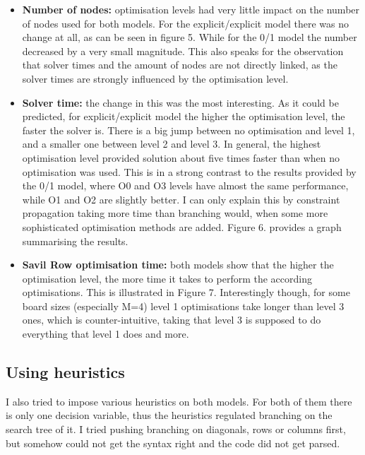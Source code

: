 \documentclass{report}
\newcommand{\tab}{\hspace*{1.5em}}
\begin{document}
\begin{itemize}
\item \textbf{Number of nodes:} optimisation levels had very little impact on the number of nodes used for both models. For the explicit/explicit model there was no change at all, as can be seen in figure 5. While for the 0/1 model the number decreased by a very small magnitude. This also speaks for the observation that solver times and the amount of nodes are not directly linked, as the solver times are strongly influenced by the optimisation level.
\item \textbf{Solver time:} the change in this was the most interesting. As it could be predicted, for explicit/explicit model the higher the optimisation level, the faster the solver is. There is a big jump between no optimisation and level 1, and a smaller one between level 2 and level 3. In general, the highest optimisation level provided solution about five times faster than when no optimisation was used. This is in a strong contrast to the results provided by the 0/1 model, where O0 and O3 levels have almost the same performance, while O1 and O2 are slightly better. I can only explain this by constraint propagation taking more time than branching would, when some more sophisticated optimisation methods are added.  Figure 6. provides a graph summarising the results.
\item \textbf{Savil Row optimisation time:} both models show that the higher the optimisation level, the more time it takes to perform the according optimisations. This is illustrated in Figure 7. Interestingly though, for some board sizes (especially M=4) level 1 optimisations take longer than level 3 ones, which is counter-intuitive, taking that level 3 is supposed to do everything that level 1 does and more.
\end{itemize}


\subsection*{Using heuristics}
\tab I also tried to impose various heuristics on both models. For both of them there is only one decision variable, thus the heuristics regulated branching on the search tree of it. I tried pushing branching on diagonals, rows or columns first, but somehow could not get the syntax right and the code did not get parsed.
\end{document}
